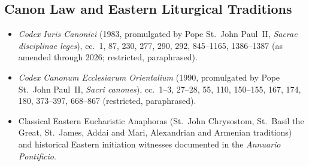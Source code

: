 \subsection{Canon Law and Eastern Liturgical Traditions}
\begin{itemize}
\item \emph{Codex Iuris Canonici} (1983, promulgated by Pope St.~John Paul~II, \emph{Sacrae disciplinae leges}), cc.~1, 87, 230, 277, 290, 292, 845--1165, 1386--1387 (as amended through 2026; restricted, paraphrased).
\item \emph{Codex Canonum Ecclesiarum Orientalium} (1990, promulgated by Pope St.~John Paul~II, \emph{Sacri canones}), cc.~1--3, 27--28, 55, 110, 150--155, 167, 174, 180, 373--397, 668--867 (restricted, paraphrased).
\item Classical Eastern Eucharistic Anaphoras (St.~John Chrysostom, St.~Basil the Great, St.~James, Addai and Mari, Alexandrian and Armenian traditions) and historical Eastern initiation witnesses documented in the \emph{Annuario Pontificio}.
\end{itemize}
